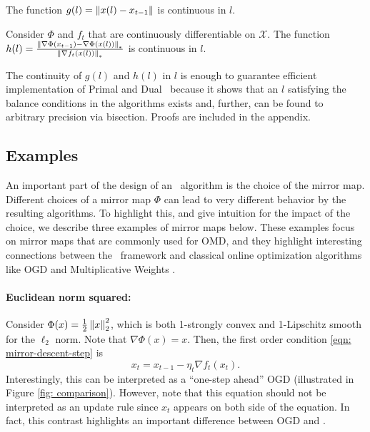 \begin{lemma}
		The function $g(l) = \left\lVert x(l) - x_{t-1} \right\rVert$ is continuous in $l$. 
		\label{lem: continuity-distance}
\end{lemma}

\begin{lemma}
Consider $\Phi$ and $f_t$ that are continuously differentiable on $\mathcal{X}$. The function \\ $h(l) = \frac{\left\lVert \nabla \Phi(x_{t-1}) - \nabla \Phi(x(l))  \right\rVert_*}{\left\lVert \nabla{f_t(x(l))} \right\rVert_*}$ is continuous in $l$. 
\label{lem: continuity-ratio}
\end{lemma}

The continuity of $g(l)$ and $h(l)$ in $l$ is enough to guarantee efficient implementation of Primal and Dual \ourack\ because it shows that an $l$ satisfying the balance conditions in the algorithms exists and, further, can be found to arbitrary precision via bisection.  Proofs are included in the appendix.

\subsection{Examples}
\label{sec:alg-examples}

An important part of the design of an \ourack\ algorithm is the choice of the mirror map.  
Different choices of a mirror map $\Phi$ can lead to very different behavior by the resulting algorithms. To highlight this, and give intuition for the impact of the choice, we describe three examples of mirror maps below.  These examples focus on mirror maps that are commonly used for OMD, and they highlight interesting connections between the \ourack\ framework and classical online optimization algorithms like OGD \citep{zinkevich2003} and Multiplicative Weights \citep{arora2012}.

\paragraph{Euclidean norm squared:} Consider $\Phi(x) = \frac{1}{2}\left\lVert x \right\rVert_2^2$, which is both 1-strongly convex and 1-Lipschitz smooth for the $\ell_2$ norm. Note that $\nabla \Phi(x) = x$.  Then, the first order condition \eqref{eqn: mirror-descent-step} is 
\begin{equation}
x_t = x_{t-1} - \eta_t \nabla f_t(x_t).
\label{eqn: one-step-ahead-GD}
\end{equation}
Interestingly, this can be interpreted as a ``one-step ahead'' OGD (illustrated in Figure \ref{fig: comparison}).  However, note that this equation should not be interpreted as an update rule since $x_t$ appears on both side of the equation.  In fact, this contrast highlights an important difference between OGD and \ourack.

